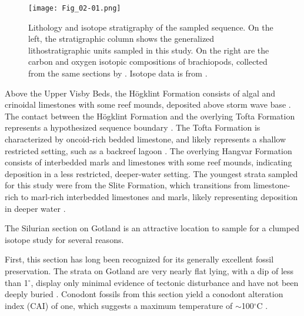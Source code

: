 \documentclass[5p, authoryear]{elsarticle}
\begin{document}
\begin{figure*}[t]
\centering
\texttt{[image: Fig\_02-01.png]}
\caption{Lithology and isotope stratigraphy of the sampled sequence. On the left, the stratigraphic column shows the generalized lithostratigraphic units sampled in this study. On the right are the carbon and oxygen isotopic compositions of brachiopods, collected from the same sections by \cite{Bickert1997}. Isotope data is from \cite{Bickert1997}.}
\label{column}
\end{figure*}

Above the Upper Visby Beds, the H\"{o}gklint Formation consists of algal and crinoidal limestones with some reef mounds, deposited above storm wave base \citep{Riding1991, Samtleben1996, Watts2000}. The contact between the H\"{o}gklint Formation and the overlying Tofta Formation represents a hypothesized sequence boundary \citep{Calner2004b}. The Tofta Formation is characterized by oncoid-rich bedded limestone, and likely represents a shallow restricted setting, such as a backreef lagoon \citep{Riding1991, Samtleben1996}. The overlying Hangvar Formation consists of interbedded marls and limestones with some reef mounds, indicating deposition in a less restricted, deeper-water setting. The youngest strata sampled for this study were from the Slite Formation, which transitions from limestone-rich to marl-rich interbedded limestones and marls, likely representing deposition in deeper water \citep{Calner2004a}. 

The Silurian section on Gotland is an attractive location to sample for a clumped isotope study for several reasons. 

First, this section has long been recognized for its generally excellent fossil preservation. The strata on Gotland are very nearly flat lying, with a dip of less than 1$^{\circ}$, display only minimal evidence of tectonic disturbance and have not been deeply buried \citep{Calner2004a, Jeppsson1983}. Conodont fossils from this section yield a conodont alteration index (CAI) of one, which suggests a maximum temperature of $\sim$100$^{\circ}$C \citep{Epstein1976, Jeppsson1983, Wenzel2000}. 
\end{document}
